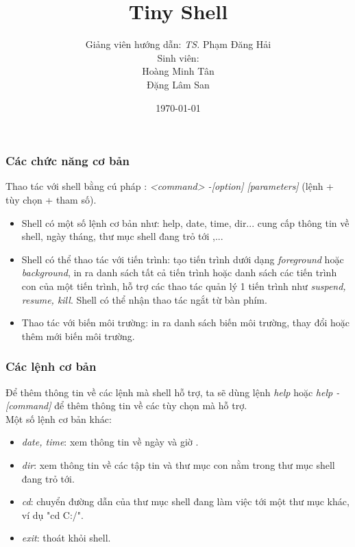 \documentclass{beamer}
\title{Tiny Shell}
\author{Giảng viên hướng dẫn: \textit{TS.} Phạm Đăng Hải\\
		Sinh viên:\\Hoàng Minh Tân\\Đặng Lâm San}
\institute{
Đại học bách Khoa Hà Nội
}
\date{\today}
\begin{document}
\begin{frame}
\titlepage
\end{frame}


%

\begin{frame}
\frametitle{Các chức năng cơ bản}
Thao tác với shell bằng cú pháp : \textit{<command> -[option] [parameters]} (lệnh + tùy chọn + tham số).\pause
\begin{itemize}
\item Shell có một số lệnh cơ bản như: help, date, time, dir... cung cấp thông tin về shell, ngày tháng, thư mục shell đang trỏ tới ,...\pause
\item Shell có thể thao tác với tiến trình: tạo tiến trình dưới dạng \textit{foreground} hoặc \textit{background}, in ra danh sách tất cả tiến trình hoặc danh sách các tiến trình con của một tiến trình, hỗ trợ các thao tác quản lý 1 tiến trình như \textit{suspend, resume, kill}. Shell có thể nhận thao tác ngắt từ bàn phím.\pause
\item Thao tác với biến môi trường: in ra danh sách biến môi trường, thay đổi hoặc thêm mới biến môi trường.
\end{itemize}
\end{frame}

\begin{frame}
\frametitle{Các lệnh cơ bản}
Để thêm thông tin về các lệnh mà shell hỗ trợ, ta sẽ dùng lệnh \textit{help} hoặc \textit{help -[command]} để thêm thông tin về các tùy chọn mà  hỗ trợ.\\\pause
Một số lệnh cơ bản khác:\pause
\begin{itemize}
\item \textit{date, time}: xem thông tin về ngày và giờ .\pause
\item \textit{dir}: xem thông tin về các tập tin và thư mục con nằm trong thư mục shell đang trỏ tới.\pause
\item \textit{cd}: chuyển đường dẫn của thư mục shell đang làm việc tới một thư mục khác, ví dụ "cd C:/".\pause
\item \textit{exit}: thoát khỏi shell.
\end{itemize}
\end{frame}
\end{document}
